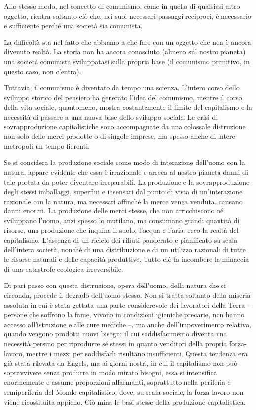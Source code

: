 \documentclass[12pt,a4paper,openany]{book}
\begin{document}
Allo stesso modo, nel concetto di comunismo, come in quello di qualsiasi altro oggetto, rientra soltanto ciò che, nei suoi necessari passaggi reciproci, è necessario e sufficiente perché una società sia comunista.

La difficoltà sta nel fatto che abbiamo a che fare con un oggetto che non è ancora divenuto realtà. La storia non ha ancora conosciuto (almeno sul nostro pianeta) una società comunista sviluppatasi sulla propria base (il comunismo primitivo, in questo caso, non c'entra).

Tuttavia, il comunismo è diventato da tempo una scienza. L'intero corso dello sviluppo storico del pensiero ha generato l'idea del comunismo, mentre il corso della vita sociale, quantomeno, mostra costantemente il limite del capitalismo e la necessità di passare a una nuova base dello sviluppo sociale. Le crisi di sovrapproduzione capitalistiche sono accompagnate da una colossale distruzione non solo delle merci prodotte o di singole imprese, ma spesso anche di intere metropoli un tempo fiorenti.

Se si considera la produzione sociale come modo di interazione dell'uomo con la natura, appare evidente che essa è irrazionale e arreca al nostro pianeta danni di tale portata da poter diventare irreparabili. La produzione e la sovrapproduzione degli stessi imballaggi, superflui e insensati dal punto di vista di un'interazione razionale con la natura, ma necessari affinché la merce venga venduta, causano danni enormi. La produzione delle merci stesse, che non arricchiscono né sviluppano l'uomo, anzi spesso lo mutilano, ma consumano grandi quantità di risorse, una produzione che inquina il suolo, l'acqua e l'aria: ecco la realtà del capitalismo. L'assenza di un riciclo dei rifiuti ponderato e pianificato su scala dell'intera società, nonché di una distribuzione e di un utilizzo razionali di tutte le risorse naturali e delle capacità produttive. Tutto ciò fa incombere la minaccia di una catastrofe ecologica irreversibile.

Di pari passo con questa distruzione, opera dell'uomo, della natura che ci circonda, procede il degrado dell'uomo stesso. Non si tratta soltanto della miseria assoluta in cui è stata gettata una parte considerevole dei lavoratori della Terra – persone che soffrono la fame, vivono in condizioni igieniche precarie, non hanno accesso all'istruzione e alle cure mediche –, ma anche dell'impoverimento relativo, quando vengono prodotti nuovi bisogni il cui soddisfacimento diventa una necessità persino per riprodurre sé stessi in quanto venditori della propria forza-lavoro, mentre i mezzi per soddisfarli risultano insufficienti. Questa tendenza era già stata rilevata da Engels, ma ai giorni nostri, in cui il capitalismo non può sopravvivere senza produrre in modo mirato bisogni, essa si intensifica enormemente e assume proporzioni allarmanti, soprattutto nella periferia e semiperiferia del Mondo capitalistico, dove, su scala sociale, la forza-lavoro non viene ricostituita appieno. Ciò mina le basi stesse della produzione capitalistica.
\end{document}
